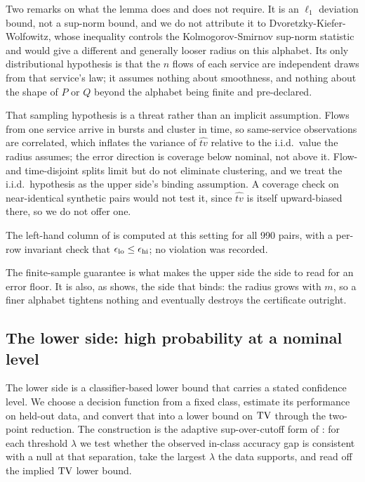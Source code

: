 Two remarks on what the lemma does and does not require. It is an $\ell_1$
deviation bound, not a sup-norm bound, and we do not attribute it to
Dvoretzky-Kiefer-Wolfowitz, whose inequality controls the Kolmogorov-Smirnov
sup-norm statistic and would give a different and generally looser radius on
this alphabet. Its only distributional hypothesis is that the $n$ flows of each
service are independent draws from that service's law; it assumes nothing about
smoothness, and nothing about the shape of $P$ or $Q$ beyond the alphabet being
finite and pre-declared.

That sampling hypothesis is a threat rather than an implicit assumption. Flows
from one service arrive in bursts and cluster in time, so same-service
observations are correlated, which inflates the variance of $\widehat{tv}$
relative to the i.i.d.\ value the radius assumes; the error direction is coverage
below nominal, not above it. Flow- and time-disjoint splits limit but do not
eliminate clustering, and we treat the i.i.d.\ hypothesis as the upper side's
binding assumption. A coverage check on near-identical synthetic pairs would not
test it, since $\widehat{tv}$ is itself upward-biased there, so we do not offer
one.

The left-hand column of  is computed at this setting for all
990 pairs, with a per-row invariant check that $\epsilon_{\mathrm{lo}} \le \epsilon_{\mathrm{hi}}$; no violation
was recorded.

The finite-sample guarantee is what makes the upper side the side to read for an
error floor. It is also, as  shows, the side that
binds: the radius grows with $m$, so a finer alphabet tightens nothing and
eventually destroys the certificate outright.

\subsection{The lower side: high probability at a nominal level}
\label{sec:design/lower}

The lower side is a classifier-based lower bound that carries a stated
confidence level. We choose a decision function from a fixed class, estimate its
performance on held-out data, and convert that into a lower bound on $\mathrm{TV}$
through the two-point reduction. The construction is the adaptive
sup-over-cutoff form of \citet{michel2020high}: for each threshold $\lambda$ we
test whether the observed in-class accuracy gap is consistent with a null at
that separation, take the largest $\lambda$ the data supports, and read off the
implied $\mathrm{TV}$ lower bound.

